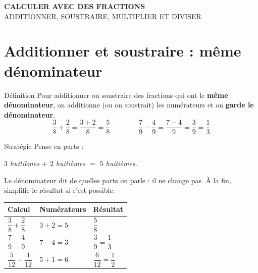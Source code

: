 \newpage
{}
\begin{center}
\begin{tcolorbox}[colback=themeNO!30,colframe=themeNO!65!black,halign=flush center,width=\textwidth,arc=3mm,boxsep=3mm]
{\Large\bfseries\color{themeNO!65!black} CALCULER AVEC DES FRACTIONS}\\
ADDITIONNER, SOUSTRAIRE, MULTIPLIER ET DIVISER
\end{tcolorbox}
\end{center}

\section{Additionner et soustraire : même dénominateur}\label{sec:AdditionnerMemeDenominateur}

\begin{regle}{Définition}
Pour \textcolor{themeColor}{additionner} ou \textcolor{themeColor}{soustraire} des fractions qui ont le \textbf{même dénominateur}, on additionne (ou on soustrait) les numérateurs et on \textbf{garde le dénominateur}.
\[\dfrac{3}{8}+\dfrac{2}{8}=\dfrac{3+2}{8}=\dfrac{5}{8} \qquad\qquad \dfrac{7}{9}-\dfrac{4}{9}=\dfrac{7-4}{9}=\dfrac{3}{9}=\dfrac{1}{3}\]
\end{regle}

\vspace{20pt}
\begin{astuce}{Stratégie}
Pense en parts :

\vspace{5pt}
{\centering\textit{$3$ huitièmes $+$ $2$ huitièmes $=$ $5$ huitièmes.}\par}

\vspace{5pt}
Le dénominateur dit de quelles parts on parle : il ne change pas. À la fin, simplifie le résultat si c'est possible.
\end{astuce}

\vspace{20pt}
\def\arraystretch{3}
\begin{tabularx}{\linewidth}{|>{\centering\arraybackslash}X|>{\centering\arraybackslash}X|>{\centering\arraybackslash}X|}
\hline
\cellcolor{themeNO!30}\textbf{Calcul} & \cellcolor{themeNO!30}\textbf{Numérateurs} & \cellcolor{themeNO!30}\textbf{Résultat} \\\hline
$\dfrac{3}{8}+\dfrac{2}{8}$ & $3+2=5$ & $\dfrac{5}{8}$ \\\hline
$\dfrac{7}{9}-\dfrac{4}{9}$ & $7-4=3$ & $\dfrac{3}{9}=\dfrac{1}{3}$ \\\hline
$\dfrac{5}{12}+\dfrac{1}{12}$ & $5+1=6$ & $\dfrac{6}{12}=\dfrac{1}{2}$ \\\hline
\end{tabularx}
\def\arraystretch{1}


